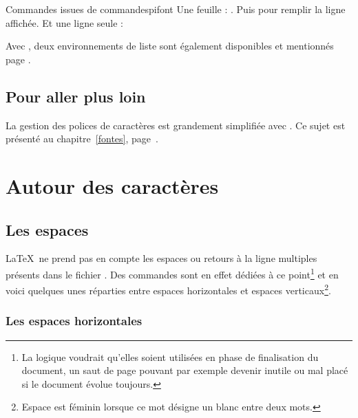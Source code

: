 \begin{codedouble}{Commandes issues de }{commandespifont}
Une feuille : . Puis  pour remplir la ligne affichée. 
Et une ligne seule : 
\end{codedouble}

Avec , deux environnements de liste sont également disponibles et mentionnés page \pageref{listepifont}.


\subsection{Pour aller plus loin}

La gestion des polices de caractères est grandement simplifiée avec \XeTeX. Ce sujet est présenté au chapitre~\ref{fontes}, page~\pageref{fontes}.

\section{Autour des caractères}

\subsection{Les espaces} %

\LaTeX\ ne prend pas en compte les espaces ou retours à la ligne multiples présents dans le fichier . Des commandes sont en effet dédiées à ce point\footnote{La logique voudrait qu'elles soient utilisées en phase de finalisation du document, un saut de page pouvant par exemple devenir inutile ou mal placé si le document évolue toujours.} et en voici quelques unes réparties entre espaces horizontales et espaces verticaux\footnote{Espace est féminin lorsque ce mot désigne un blanc entre deux mots.}.

\subsubsection{Les espaces horizontales}

